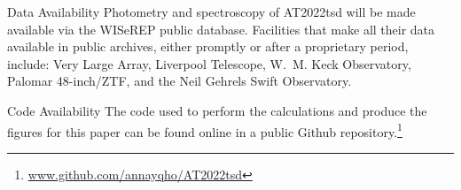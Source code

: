 \documentclass{nature_plusfigure}
\begin{document}
\begin{addendum}
 \item[Data Availability] Photometry and spectroscopy of AT2022tsd will be made available via the WISeREP public database. Facilities that make all their data available in public archives, either promptly or after a proprietary period, include: Very Large Array, Liverpool Telescope, W.~M. Keck Observatory, Palomar 48-inch/ZTF, 
 and the Neil Gehrels Swift Observatory. 

 \item[Code Availability] The code used to perform the calculations and produce the figures for this paper can be found online in a public Github repository.\footnote{\url{www.github.com/annayqho/AT2022tsd}}

\end{addendum}


\clearpage
\newpage
\end{document}
